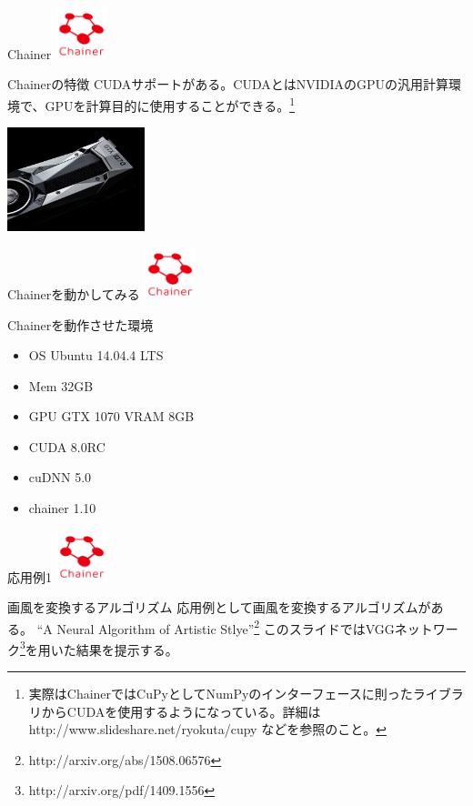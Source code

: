 \documentclass[12pt, unicode]{beamer}
\begin{document}
\begin{frame}{Chainer}
\includegraphics[clip,width=1.5cm]{image/chainer_logo.png}
\begin{block}{Chainerの特徴}
CUDAサポートがある。CUDAとはNVIDIAのGPUの汎用計算環境で、GPUを計算目的に使用することができる。\footnote[frame]{実際はChainerではCuPyとしてNumPyのインターフェースに則ったライブラリからCUDAを使用するようになっている。詳細は http://www.slideshare.net/ryokuta/cupy などを参照のこと。}
\end{block}
\includegraphics[clip,width=4.0cm]{image/gallery-gtx-1070-4-large.jpg}
\end{frame}

\begin{frame}{Chainerを動かしてみる}
\includegraphics[clip,width=1.5cm]{image/chainer_logo.png}
\begin{block}{Chainerを動作させた環境}
\begin{itemize}
\item OS Ubuntu 14.04.4 LTS
\item Mem 32GB
\item GPU GTX 1070 VRAM 8GB
\item CUDA 8.0RC
\item cuDNN 5.0
\item chainer 1.10
\end{itemize}
\end{block}
\end{frame}

\begin{frame}{応用例1}
\includegraphics[clip,width=1.5cm]{image/chainer_logo.png}
\begin{block}{画風を変換するアルゴリズム}
応用例として画風を変換するアルゴリズムがある。
``A Neural Algorithm of Artistic Stlye''\footnote[frame]{http://arxiv.org/abs/1508.06576}
このスライドではVGGネットワーク\footnote[frame]{http://arxiv.org/pdf/1409.1556}を用いた結果を提示する。
\end{block}
\end{frame}
\end{document}
